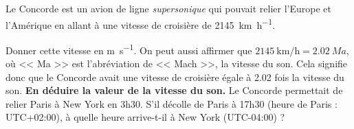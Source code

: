 \documentclass[../Cours.tex]{subfiles}
\begin{document}
\begin{questions}
    \exercice Le Concorde est un avion de ligne \emph{supersonique} qui pouvait relier l'Europe et l'Amérique en allant à une vitesse de croisière de \qty{2145}{\kilo\metre\per\hour}.

    \question Donner cette vitesse en \unit{\metre\per\second}.
    \question On peut aussi affirmer que $\qty{2145}{\kilo\metre\per\hour} = \qty{2.02}{Ma}$, où << Ma >> est l'abréviation de << Mach >>, la vitesse du son. Cela signifie donc que le Concorde avait une vitesse de croisière égale à \num{2.02} fois la vitesse du son. \textbf{En déduire la valeur de la vitesse du son.}
    \question Le Concorde permettait de relier Paris à New York en 3h30. S'il décolle de Paris à 17h30 (heure de Paris : UTC+02:00), à quelle heure arrive-t-il à New York (UTC-04:00) ?
\end{questions}
\end{document}
